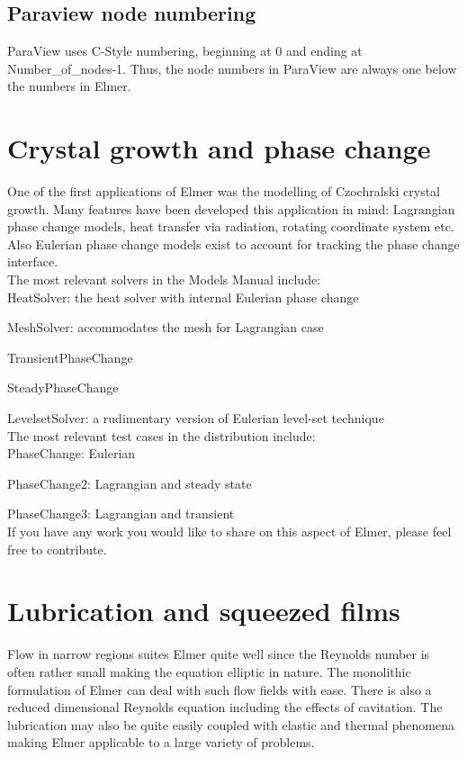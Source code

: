 \subsection{Paraview node numbering}

ParaView uses C-Style numbering, beginning at 0 and ending at Number\_of\_nodes-1. Thus, the node numbers in ParaView are always one below the numbers in Elmer. 

\section{Crystal growth and phase change}

One of the first applications of Elmer was the modelling of Czochralski crystal growth. Many features have been developed this application in mind: Lagrangian phase change models, heat transfer via radiation, rotating coordinate system etc. Also Eulerian phase change models exist to account for tracking the phase change interface.\\

\noindent The most relevant solvers in the Models Manual include:\\

    HeatSolver: the heat solver with internal Eulerian phase change

    MeshSolver: accommodates the mesh for Lagrangian case

    TransientPhaseChange

    SteadyPhaseChange

    LevelsetSolver: a rudimentary version of Eulerian level-set technique\\

\noindent The most relevant test cases in the distribution include:\\

    PhaseChange: Eulerian

    PhaseChange2: Lagrangian and steady state

    PhaseChange3: Lagrangian and transient\\

\noindent If you have any work you would like to share on this aspect of Elmer, please feel free to contribute. 

\section{Lubrication and squeezed films}

Flow in narrow regions suites Elmer quite well since the Reynolds number is often rather small making the equation elliptic in nature. The monolithic formulation of Elmer can deal with such flow fields with ease. There is also a reduced dimensional Reynolds equation including the effects of cavitation. The lubrication may also be quite easily coupled with elastic and thermal phenomena making Elmer applicable to a large variety of problems.\\

